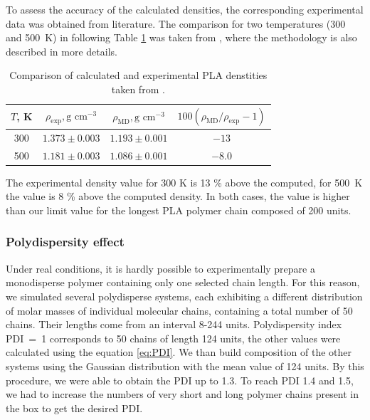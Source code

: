 \newpage
To assess the accuracy of the calculated densities, the corresponding experimental data was obtained from literature. The comparison for two temperatures (300 and 500~K) in following Table \ref{tab:PLA_dens} was taken from \cite{klajmon_glass_2023}, where the methodology is also described in more details.

\begin{table}[htbp]
	\centering
	\caption{Comparison of calculated and experimental PLA denstities taken from \cite{klajmon_glass_2023}.}
	\begin{tabular}{cccc}
		\toprule
		$T$, K & $\rho_{\text{exp}},  \text{g cm}^{-3}$ & $\rho_{\text{MD}}, \text{g cm}^{-3}$ & $100(\rho_{\text{MD}}/\rho_{\text{exp}}-1)$\\
		\midrule
		 300   & $1.373 \pm 0.003$ & $1.193 \pm 0.001$ & $-13$\\
		 500   & $1.181 \pm 0.003$ & $1.086 \pm 0.001$ & $-8.0$ \\
		\bottomrule
	\end{tabular}%
	\label{tab:PLA_dens}%
	\vspace{-0.4cm}
\end{table}%

The experimental density value for 300 K is 13 \% above the computed, for 500~K the value is 8 \% above the computed density. In both cases, the value is higher than our limit value for the longest PLA polymer chain composed of 200 units.
 
\subsubsection{Polydispersity effect}
Under real conditions, it is hardly possible to experimentally prepare a monodisperse polymer containing only one selected chain length. For this reason, we simulated several polydisperse systems, each exhibiting a different distribution of molar masses of individual molecular chains, containing a total number of 50 chains. Their lengths come from an interval 8-244 units. Polydispersity index PDI~=~1 corresponds to 50 chains of length 124 units, the other values were calculated using the equation \ref{eq:PDI}. We than build composition of the other systems using the Gaussian distribution with the mean value of 124 units. By this procedure, we were able to obtain the PDI up to 1.3. To reach PDI 1.4 and 1.5, we had to increase the numbers of very short and long polymer chains present in the box to get the desired PDI. 



